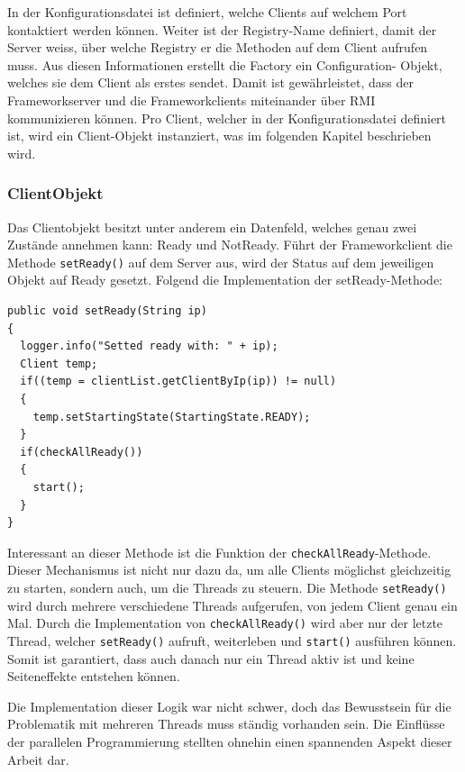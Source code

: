 In der Konfigurationsdatei ist definiert, welche Clients auf welchem Port kontaktiert werden können. Weiter ist der Registry-Name definiert, damit der Server weiss, über welche Registry er die Methoden auf dem Client aufrufen muss. \newline
Aus diesen Informationen erstellt die Factory ein Configuration- Objekt, welches sie dem Client als erstes sendet. Damit ist gewährleistet, dass der Frameworkserver und die Frameworkclients miteinander über RMI kommunizieren können. \newline
Pro Client, welcher in der Konfigurationsdatei definiert ist, wird ein Client-Objekt instanziert, was im folgenden Kapitel beschrieben wird.

\subsubsection{ClientObjekt}
\label{sec:clientObjekt}

Das Clientobjekt besitzt unter anderem ein Datenfeld, welches genau zwei Zustände annehmen kann: Ready und NotReady. Führt der Frameworkclient die Methode \texttt{setReady()} auf dem Server aus, wird der Status auf dem jeweiligen Objekt auf Ready gesetzt. Folgend die Implementation der setReady-Methode:
\begin{verbatim}
public void setReady(String ip) 
{
  logger.info("Setted ready with: " + ip);
  Client temp;
  if((temp = clientList.getClientByIp(ip)) != null)
  {
    temp.setStartingState(StartingState.READY);
  }
  if(checkAllReady())
  {
    start();
  }
}
\end{verbatim}

Interessant an dieser Methode ist die Funktion der \texttt{checkAllReady}-Me\-tho\-de. Dieser Mecha\-nismus ist nicht nur dazu da, um alle Clients mög\-lichst gleichzeitig zu starten, sondern auch, um die Threads zu steuern. Die Methode \texttt{setReady()} wird durch mehrere verschiedene Threads aufgerufen, von jedem Client genau ein Mal. Durch die Implementation von \texttt{checkAllReady()} wird aber nur der letzte Thread, welcher \texttt{setReady()} aufruft, weiterleben und \texttt{start()} ausführen können. Somit ist garantiert, dass auch danach nur ein Thread aktiv ist und keine Seiteneffekte entstehen können.

Die Implementation dieser Logik war nicht schwer, doch das Bewusstsein für die Problematik mit mehreren Threads muss ständig vorhanden sein. Die Einflüsse der parallelen Programmierung stellten ohnehin einen spannenden Aspekt dieser Arbeit dar. 

